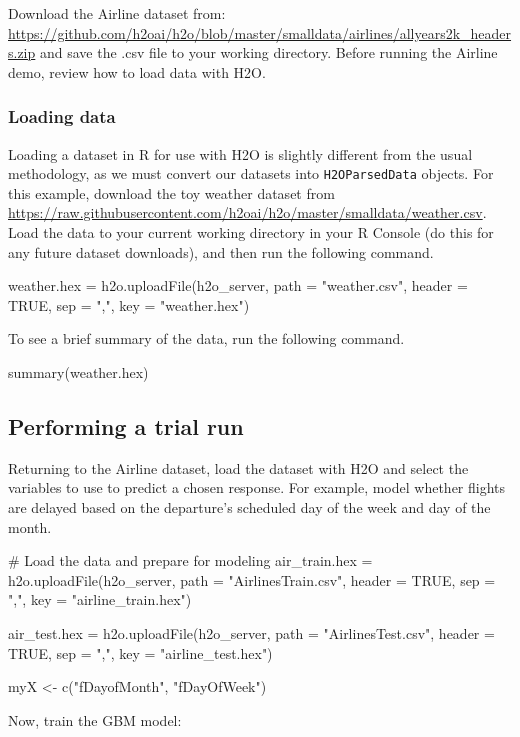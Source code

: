 \documentclass{article}[11pt]
\begin{document}
{Download the Airline dataset from: {\url{https://github.com/h2oai/h2o/blob/master/smalldata/airlines/allyears2k_headers.zip}} and save the .csv file to your working directory. Before running the Airline demo, review how to load data with H2O. 

\subsubsection{Loading data}  

Loading a dataset in R for use with H2O is slightly different from the usual methodology, as we must convert our datasets into \texttt{H2OParsedData} objects. For this example, download the toy weather dataset from {\url{https://raw.githubusercontent.com/h2oai/h2o/master/smalldata/weather.csv}}.  Load the data to your current working directory in your R Console (do this for any future dataset downloads), and then run the following command.
\begin{spverbatim}
weather.hex = h2o.uploadFile(h2o_server, path = "weather.csv", header = TRUE, sep = ",", key = "weather.hex")
\end{spverbatim}
\bigskip
\noindent
To see a brief summary of the data, run the following command.
\begin{spverbatim}
summary(weather.hex)
\end{spverbatim}


\subsection{Performing a trial run}  
Returning to the Airline dataset, load the dataset with H2O and select the variables to use to predict a chosen response. For example, model whether flights are delayed based on the departure's scheduled day of the week and day of the month.
\begin{spverbatim}

# Load the data and prepare for modeling
air_train.hex = h2o.uploadFile(h2o_server, path = "AirlinesTrain.csv", header = TRUE, sep = ",", key = "airline_train.hex")

air_test.hex = h2o.uploadFile(h2o_server, path = "AirlinesTest.csv", header = TRUE, sep = ",", key = "airline_test.hex")

myX <- c("fDayofMonth", "fDayOfWeek")

\end{spverbatim}

Now, train the GBM model:

}
\end{document}
